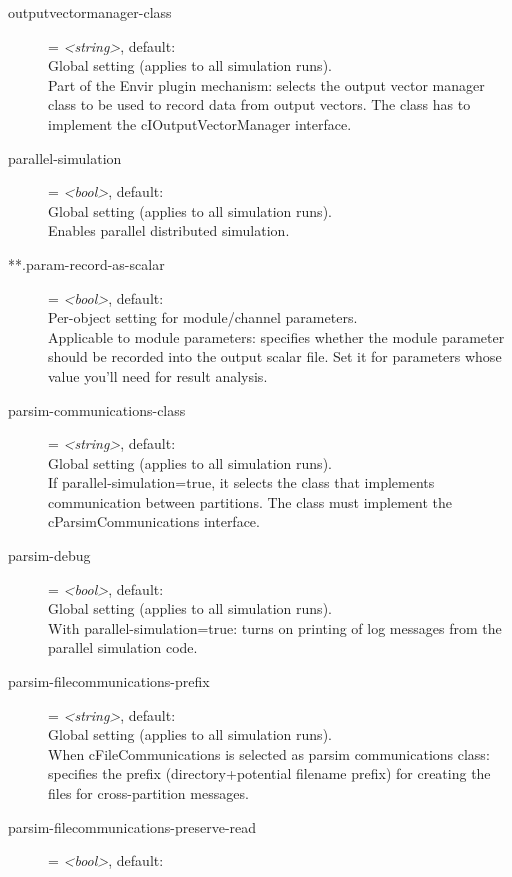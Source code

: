 \begin{description}
\item[outputvectormanager-class] = \textit{<string>}, default: \\
    Global setting (applies to all simulation runs).\\
    Part of the Envir plugin mechanism: selects the output vector manager class
    to be used to record data from output vectors. The class has to implement
    the cIOutputVectorManager interface.
\item[parallel-simulation] = \textit{<bool>}, default: \\
    Global setting (applies to all simulation runs).\\
    Enables parallel distributed simulation.
\item[**.param-record-as-scalar] = \textit{<bool>}, default: \\
    Per-object setting for module/channel parameters.\\
    Applicable to module parameters: specifies whether the module parameter
    should be recorded into the output scalar file. Set it for parameters whose
    value you'll need for result analysis.
\item[parsim-communications-class] = \textit{<string>}, default: \\
    Global setting (applies to all simulation runs).\\
    If parallel-simulation=true, it selects the class that implements
    communication between partitions. The class must implement the
    cParsimCommunications interface.
\item[parsim-debug] = \textit{<bool>}, default: \\
    Global setting (applies to all simulation runs).\\
    With parallel-simulation=true: turns on printing of log messages from the
    parallel simulation code.
\item[parsim-filecommunications-prefix] = \textit{<string>}, default: \\
    Global setting (applies to all simulation runs).\\
    When cFileCommunications is selected as parsim communications class:
    specifies the prefix (directory+potential filename prefix) for creating the
    files for cross-partition messages.
\item[parsim-filecommunications-preserve-read] = \textit{<bool>}, default: \\

\end{description}
